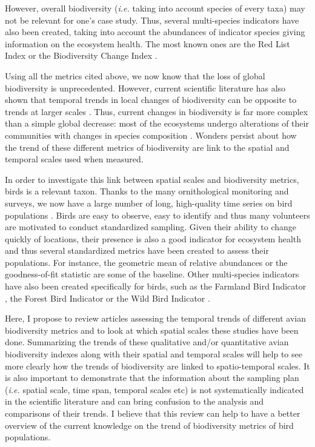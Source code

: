 \documentclass[
  12pt,
  oneside]{report}
\begin{document}
However, overall biodiversity (\emph{i.e.} taking into account species of every taxa) may not be relevant for one's case study. Thus, several multi-species indicators have also been created, taking into account the abundances of indicator species giving information on the ecosystem health. The most known ones are the Red List Index \citep{butchart_improvements_2007, butchart_using_2005, butchart_measuring_2004} or the Biodiversity Change Index \citep{normander_indicator_2012}.

Using all the metrics cited above, we now know that the loss of global biodiversity is unprecedented. However, current scientific literature has also shown that temporal trends in local changes of biodiversity can be opposite to trends at larger scales \citep[\emph{e.g.}][]{chase_species_2019}. Thus, current changes in biodiversity is far more complex than a simple global decrease: most of the ecosystems undergo alterations of their communities with changes in species composition \citep{blowes_geography_2019, dornelas_quantifying_2013}. Wonders persist about how the trend of these different metrics of biodiversity are link to the spatial and temporal scales used when measured.

In order to investigate this link between spatial scales and biodiversity metrics, birds is a relevant taxon. Thanks to the many ornithological monitoring and surveys, we now have a large number of long, high-quality time series on bird populations \citep{bejcek_velke_2016}. Birds are easy to observe, easy to identify and thus many volunteers are motivated to conduct standardized sampling. Given their ability to change quickly of locations, their presence is also a good indicator for ecosystem health and thus several standardized metrics have been created to assess their populations. For instance, the geometric mean of relative abundances or the goodness-of-fit statistic \citep{studeny_goodness_2011} are some of the baseline. Other multi-species indicators have also been created specifically for birds, such as the Farmland Bird Indicator \citep{gregory_developing_2005}, the Forest Bird Indicator \citep{gregory_population_2007} or the Wild Bird Indicator \citep{gregory_wild_2010}.

Here, I propose to review articles assessing the temporal trends of different avian biodiversity metrics and to look at which spatial scales these studies have been done. Summarizing the trends of these qualitative and/or quantitative avian biodiversity indexes along with their spatial and temporal scales will help to see more clearly how the trends of biodiversity are linked to spatio-temporal scales. It is also important to demonstrate that the information about the sampling plan (\emph{i.e.} spatial scale, time span, temporal scales etc) is not systematically indicated in the scientific literature and can bring confusion to the analysis and comparisons of their trends. I believe that this review can help to have a better overview of the current knowledge on the trend of biodiversity metrics of bird populations.
\end{document}
